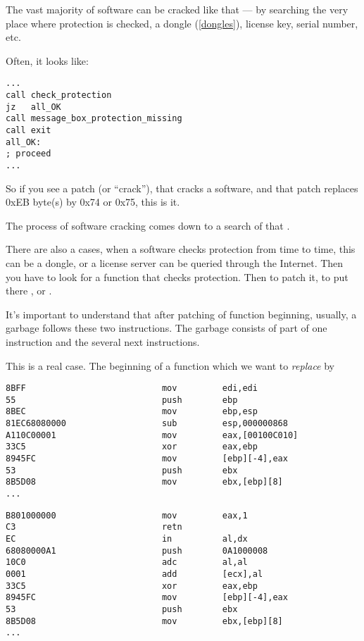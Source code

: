 \label{\SoftwareCracking}

The vast majority of software can be cracked like that --- by searching the very place where protection is checked, a dongle
(\ref{dongles}), license key, serial number, etc.

Often, it looks like:

\begin{lstlisting}[style=customasmx86]
...
call check_protection
jz   all_OK
call message_box_protection_missing
call exit
all_OK:
; proceed
...
\end{lstlisting}

So if you see a patch (or ``crack''), that cracks a software, and that patch replaces 0xEB byte(s) by 0x74 or 0x75, this is it.

The process of software cracking comes down to a search of that .

\myhrule{}

There are also a cases, when a software checks protection from time to time, this can be a dongle, or a license server
can be queried through the Internet.
Then you have to look for a function that checks protection.
Then to patch it, to put there , or .

It's important to understand that after patching of function beginning, usually, a garbage follows these two instructions.
The garbage consists of part of one instruction and the several next instructions.

This is a real case.
The beginning of a function which we want to \emph{replace} by 

\begin{lstlisting}[style=customasmx86,caption=Before]
8BFF                           mov         edi,edi
55                             push        ebp
8BEC                           mov         ebp,esp
81EC68080000                   sub         esp,000000868
A110C00001                     mov         eax,[00100C010]
33C5                           xor         eax,ebp
8945FC                         mov         [ebp][-4],eax
53                             push        ebx
8B5D08                         mov         ebx,[ebp][8]
...
\end{lstlisting}

\begin{lstlisting}[style=customasmx86,caption=After]
B801000000                     mov         eax,1
C3                             retn
EC                             in          al,dx
68080000A1                     push        0A1000008
10C0                           adc         al,al
0001                           add         [ecx],al
33C5                           xor         eax,ebp
8945FC                         mov         [ebp][-4],eax
53                             push        ebx
8B5D08                         mov         ebx,[ebp][8]
...
\end{lstlisting}

